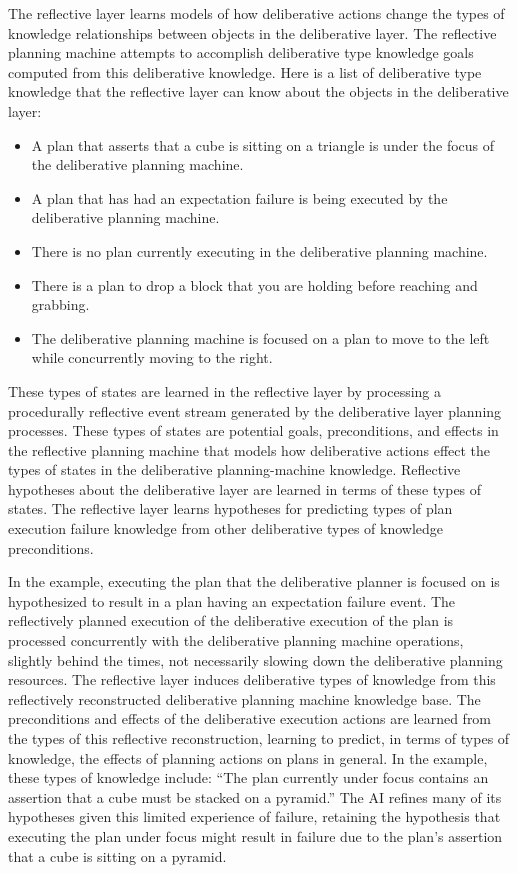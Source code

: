 The reflective layer learns models of how deliberative actions change
the types of knowledge relationships between objects in the
deliberative layer.  The reflective planning machine attempts to
accomplish deliberative type knowledge goals computed from this
deliberative knowledge.  Here is a list of deliberative type knowledge
that the reflective layer can know about the objects in the
deliberative layer:
\begin{itemize}
\item A plan that asserts that a cube is sitting on a triangle is
  under the focus of the deliberative planning machine.
\item A plan that has had an expectation failure is being executed by
  the deliberative planning machine.
\item There is no plan currently executing in the deliberative
  planning machine.
\item There is a plan to drop a block that you are holding before
  reaching and grabbing.
\item The deliberative planning machine is focused on a plan to move
  to the left while concurrently moving to the right.
\end{itemize}
These types of states are learned in the reflective layer by
processing a procedurally reflective event stream generated by the
deliberative layer planning processes.  These types of states are
potential goals, preconditions, and effects in the reflective planning
machine that models how deliberative actions effect the types of
states in the deliberative planning-machine knowledge.  Reflective
hypotheses about the deliberative layer are learned in terms of these
types of states.  The reflective layer learns hypotheses for
predicting types of plan execution failure knowledge from other
deliberative types of knowledge preconditions.

In the example, executing the plan that the deliberative planner is
focused on is hypothesized to result in a plan having an expectation
failure event.  The reflectively planned execution of the deliberative
execution of the plan is processed concurrently with the deliberative
planning machine operations, slightly behind the times, not
necessarily slowing down the deliberative planning resources.  The
reflective layer induces deliberative types of knowledge from this
reflectively reconstructed deliberative planning machine knowledge
base.  The preconditions and effects of the deliberative execution
actions are learned from the types of this reflective reconstruction,
learning to predict, in terms of types of knowledge, the effects of
planning actions on plans in general.  In the example, these types of
knowledge include: ``The plan currently under focus contains an
assertion that a cube must be stacked on a pyramid.''  The AI refines
many of its hypotheses given this limited experience of failure,
retaining the hypothesis that executing the plan under focus might
result in failure due to the plan's assertion that a cube is sitting
on a pyramid.

